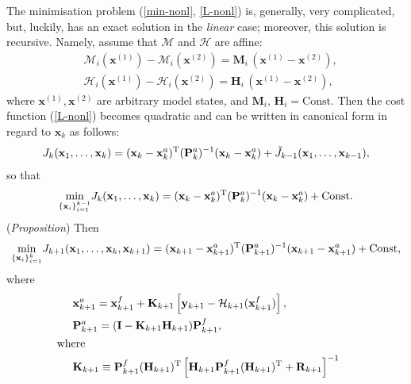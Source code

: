 \documentclass[11pt]{report}
\newcommand{\mb} {\mathbf}
\newcommand{\T}{^{\tiny \mathrm T}}
\begin{document}
The minimisation problem (\ref{min-nonl}, \ref{L-nonl}) is, generally, very complicated, but, luckily, has an exact solution in the \emph{linear} case; moreover, this solution is recursive.
Namely, assume that $\mathcal M$ and $\mathcal H$ are affine:
\begin{subequations}
  \label{lin}
  \begin{align}
    \label{lin-M}
    &\mathcal M_i(\mb x^{(1)}) - \mathcal M_i(\mb x^{(2)}) = \mb M_i \, (\mb x^{(1)} - \mb x^{(2)}),\\
    \label{lin-H}
    &\mathcal H_i(\mb x^{(1)}) - \mathcal H_i(\mb x^{(2)}) = \mb H_i \, (\mb x^{(1)} - \mb x^{(2)}),
  \end{align}
\end{subequations}
where $\mb x^{(1)}, \mb x^{(2)}$ are arbitrary model states, and $\mb M_i,\, \mb H_i = \mathrm{Const}$.
Then the cost function (\ref{L-nonl}) becomes quadratic and can be written in canonical form in regard to $\mb x_k$ as follows:
\begin{align*}
   J_k(\mb x_1, \dots, \mb x_k) = (\mb x_k - \mb x_k^a)\T (\mb P_{k}^a)^{-1}(\mb x_k - \mb x_k^a) + \tilde{{J}}_{k-1}(\mb x_1,\dots,\mb x_{k-1}),
\end{align*}
so that
\begin{align}
  \label{min-xk}
  \underset {\{\mb x_i\}_{i = 1}^{k - 1}}{\min} J_k(\mb x_1, \dots, \mb x_k) = (\mb x_k - \mb x_k^a)\T (\mb P_{k}^a)^{-1}(\mb x_k - \mb x_k^a) + \mathrm{Const}.
\end{align}
(\emph{Proposition}) Then
\begin{align}
  \label{min-xkp1}
    \underset {\{\mb x_i\}_{i = 1}^{k}}{\min} J_{k+1}(\mb x_1, \dots, \mb x_k, \mb x_{k+1}) = (\mb x_{k+1} - \mb x_{k+1}^a)\T (\mb P_{k+1}^a)^{-1}(\mb x_{k+1} - \mb x_{k+1}^a) + \mathrm{Const},
\end{align}
where
\begin{subequations}
  \label{kf-an}
  \begin{align}
    \label{kf-an-x}
    & \mb x_{k+1}^a = \mb x_{k+1}^f + \mb K_{k+1} \left [\mb y_{k+1} - \mathcal H_{k+1}(\mb x_{k+1}^f) \right ],\\
    \label{kf-an-P}
    & \mb P_{k+1}^a = (\mb I - \mb K_{k+1} \mb H_{k+1}) \mb P_{k+1}^f,\\
    \nonumber
    & \hspace{-0.5cm} \text{where}\\
    \label{kf-K}
    & \mb K_{k+1} \equiv \mb P^f_{k+1} (\mb H_{k+1})\T \left [\mb H_{k+1} \mb P_{k+1}^f (\mb H_{k+1})\T + \mb R_{k+1} \right ]^{-1}
  \end{align}
\end{subequations}
\end{document}

